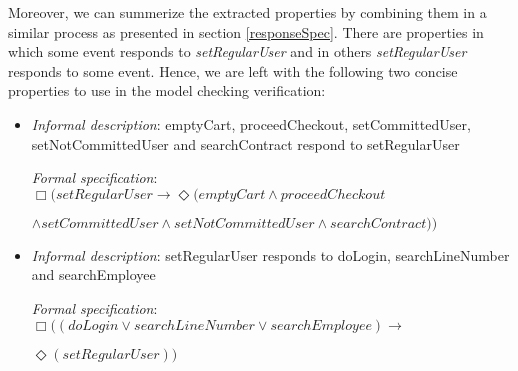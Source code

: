 Moreover, we can summerize the extracted properties by combining them in a similar process as presented in section \ref{responseSpec}. There are properties in which some event responds to \textit{setRegularUser} and in others \textit{setRegularUser} responds to some event. Hence, we are left with the following two concise properties to use in the model checking verification:

\begin{itemize}

\item \textit{Informal description}: emptyCart, proceedCheckout, setCommittedUser, setNotCommittedUser and searchContract respond to setRegularUser

\textit{Formal specification}: $\Box(setRegularUser \rightarrow \Diamond(emptyCart \wedge proceedCheckout$

$ \wedge setCommittedUser \wedge setNotCommittedUser \wedge searchContract))$

\item \textit{Informal description}: setRegularUser responds to doLogin, searchLineNumber and searchEmployee

\textit{Formal specification}: $\Box ((doLogin \vee searchLineNumber \vee searchEmployee) \rightarrow $

$\Diamond(setRegularUser))$

\end{itemize}

\iffalse
\begin{table}[h]
\begin{center}
\begin{tabular}{|p{7cm}|p{10cm}|}

\hline

Informal description & Formal specification \\ \hline

emptyCart, proceedCheckout, setCommittedUser, setNotCommittedUser and searchContract respond to setRegularUser & $\Box (setRegularUser \rightarrow \Diamond (emptyCart \wedge proceedCheckout \wedge setCommittedUser \wedge setNotCommittedUser \wedge searchContract))$ \\ \hline
setRegularUser responds to doLogin, searchLineNumber and searchEmployee & $\Box ((doLogin \vee searchLineNumber \vee searchEmployee) \rightarrow \Diamond(setRegularUser))$ \\

\hline
\end{tabular}
\end{center}
\caption{Combined properties from \ref{specificProperties}}
\label{specificPropertiesCombined}
\end{table}
\fi
